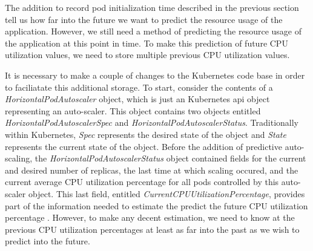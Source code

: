The addition to record pod initialization time described in the
previous section tell us how far into the future
we want to predict the resource usage of the application. However, we still need
a method of predicting the resource usage of the application at this point in
time. To make this prediction of future CPU utilization values,
we need to store multiple previous CPU utilization values.

It is necessary to make a couple of changes to the Kubernetes code base in order
to faciliatate this additional storage. To start,
consider the contents of a \textit{HorizontalPodAutoscaler} object, which is
just an Kubernetes api object representing an auto-scaler. This object contains
two objects entitled \textit{HorizontalPodAutoscalerSpec} and
\textit{HorizontalPodAutoscalerStatus}. Traditionally within
Kubernetes, \textit{Spec} represents the desired state of the object and
\textit{State} represents the current state of the object. Before the addition
of predictive auto-scaling, the \textit{HorizontalPodAutoscalerStatus} object
contained fields for the current and desired number of replicas, the last time
at which scaling occured, and the current average CPU utilization percentage for
all pods controlled by this auto-scaler object. This last field, entitled
\textit{CurrentCPUUtilizationPercentage}, provides part of the information
needed to estimate the predict the future CPU utilization
percentage \cite{k8s-horizontal-pod-autoscaler-object}.
However, to make any decent estimation, we need to know at the previous CPU
utilization percentages at least as far into the past as we wish to predict into
the future.


